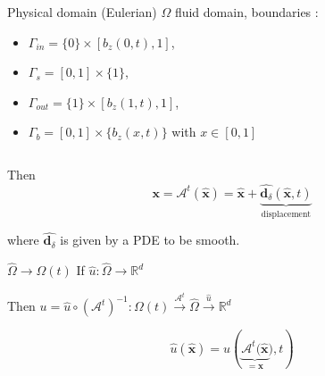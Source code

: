 \begin{frame}{}
\begin{columns}

\begin{block}{Physical domain (Eulerian)}
$\Omega$ fluid domain, boundaries :
\begin{itemize}
\item $\Gamma_{in} = \{ 0 \} \times \left[ b_z(0,t),1 \right]$,

\item $\Gamma_{s} = \left[ 0,1 \right] \times \{ 1 \} $,

\item $\Gamma_{out} = \{ 1 \} \times \left[ b_z(1,t),1 \right]$,

\item $\Gamma_{b} = \left[ 0,1 \right] \times \{ b_z(x,t) \}$ with $x \in \left[ 0,1 \right]$
\end{itemize}
\end{block}

\end{columns}

\end{frame}


\begin{frame}

Then 
$$\mathbf{x} = \mathcal{A}^t ( \widehat{\mathbf{x}} ) = \widehat{\mathbf{x}} + \underbrace{\widehat{\mathbf{d}_{\delta}} ( \widehat{\mathbf{x}}, t)}_{\text{displacement}} $$

where $\widehat{\mathbf{d}_{\delta}}$ is given by a PDE to be smooth.

\begin{block}{$\widehat{\Omega} \rightarrow \Omega(t)$}
If $\widehat{u} : \widehat{\Omega} \rightarrow \mathbb{R}^d$

Then $u = \widehat{u} \circ \left( \mathcal{A}^t \right)^{-1} : \Omega(t) \overset{\mathcal{A}^t}{\longrightarrow} \widehat{\Omega} \overset{\widehat{u}}{\longrightarrow} \mathbb{R}^d$

$$\widehat{u} ( \widehat{ \mathbf{x} } ) = u \left( \underbrace{\mathcal{A}^t ( \widehat{\mathbf{x}}}_{= \mathbf{x}} ), t \right)$$
\end{block}

\end{frame}


